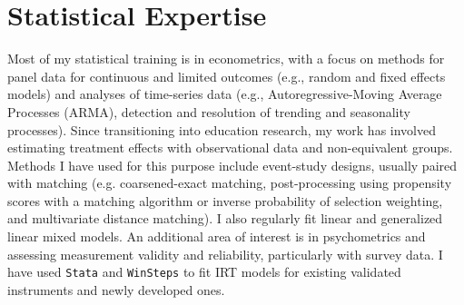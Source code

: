 \documentclass[11pt,a4paper,sans, colorlinks,linkcolor=true]{moderncv}        %
\begin{document}
\section{Statistical Expertise}
\cvitem{}{}Most of my statistical training is in econometrics, with a focus on methods for panel data for continuous and limited outcomes (e.g., random and fixed effects models) and analyses of time-series data (e.g.,  Autoregressive-Moving Average Processes (ARMA), detection and resolution of trending and seasonality processes). Since transitioning into education research, my work has involved estimating treatment effects with observational data and non-equivalent groups. Methods I have used for this purpose include event-study designs, usually paired with matching (e.g. coarsened-exact matching, post-processing using propensity scores with a matching algorithm or inverse probability of selection weighting, and multivariate distance matching). I also regularly fit linear and generalized linear mixed models. An additional area of interest is in psychometrics and assessing measurement validity and reliability, particularly with survey data. I have used \texttt{Stata} and \texttt{WinSteps} to fit IRT models for existing validated instruments and newly developed ones.
\begin{comment}
\section{Extra 1}{\tiny }
\cvlistitem{Item 1}
\cvlistitem{Item 2}
\cvlistitem{Item 3. This item is particularly long and therefore normally spans over several lines. Did you notice the indentation when the line wraps?}

\section{Extra 2}
\cvlistdoubleitem{Item 1}{Item 4}
\cvlistdoubleitem{Item 2}{Item 5\cite{book1}}
\cvlistdoubleitem{Item 3}{Item 6. Like item 3 in the single column list before, this item is particularly long to wrap over several lines.}

\section{References}
\begin{cvcolumns}
  \cvcolumn{Category 1}{\begin{itemize}\item Person 1\item Person 2\item Person 3\end{itemize}}
  \cvcolumn{Category 2}{Amongst others:\begin{itemize}\item Person 1, and\item Person 2\end{itemize}(more upon request)}
  \cvcolumn[0.5]{All the rest \& some more}{\textit{That} person, and \textbf{those} also (all available upon request).}
\end{cvcolumns}
\end{comment}
\end{document}
